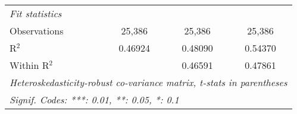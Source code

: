 \begin{tabular}{lccc}
   \midrule
   \emph{Fit statistics}\\
   Observations  & 25,386           & 25,386           & 25,386\\  
   R$^2$         & 0.46924          & 0.48090          & 0.54370\\  
   Within R$^2$  &                  & 0.46591          & 0.47861\\  
   \midrule \midrule
   \multicolumn{4}{l}{\emph{Heteroskedasticity-robust co-variance matrix, t-stats in parentheses}}\\
   \multicolumn{4}{l}{\emph{Signif. Codes: ***: 0.01, **: 0.05, *: 0.1}}\\
\end{tabular}
\par\endgroup


